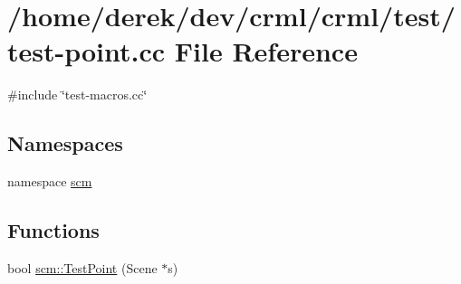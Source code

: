 \hypertarget{test-point_8cc}{
\section{/home/derek/dev/crml/crml/test/test-\/point.cc File Reference}
\label{test-point_8cc}
}
{\ttfamily \#include \char`\"{}test-\/macros.cc\char`\"{}}\par
\subsection*{Namespaces}
\begin{DoxyCompactItemize}
\item 
namespace \hyperlink{namespacescm}{scm}
\end{DoxyCompactItemize}
\subsection*{Functions}
\begin{DoxyCompactItemize}
\item 
bool \hyperlink{namespacescm_aca67b9b84fd6253da0c69b4c521e6bc6}{scm::TestPoint} (Scene $\ast$s)
\end{DoxyCompactItemize}
